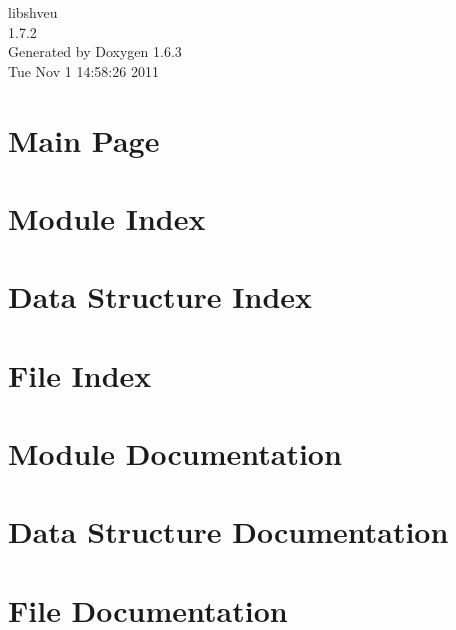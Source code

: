 \documentclass[a4paper]{book}
\begin{document}
\begin{titlepage}
\vspace*{7cm}
\begin{center}
{\Large libshveu \\[1ex]\large 1.7.2 }\\
\vspace*{1cm}
{\large Generated by Doxygen 1.6.3}\\
\vspace*{0.5cm}
{\small Tue Nov 1 14:58:26 2011}\\
\end{center}
\end{titlepage}
\clearemptydoublepage
{}
\tableofcontents
\clearemptydoublepage
{}
\chapter{Main Page}
\label{index}
\chapter{Module Index}

\chapter{Data Structure Index}

\chapter{File Index}

\chapter{Module Documentation}



\chapter{Data Structure Documentation}



\chapter{File Documentation}


\printindex
\end{document}
